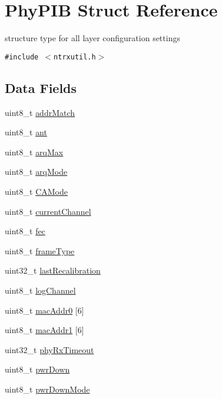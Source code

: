\hypertarget{structPhyPIB}{
\section{Phy\-PIB Struct Reference}
\label{structPhyPIB}
}
structure type for all layer configuration settings  


{\tt \#include $<$ntrxutil.h$>$}

\subsection*{Data Fields}
\begin{CompactItemize}
\item 
uint8\_\-t \hyperlink{structPhyPIB_d9f427fffb85f5e78768cdb51d926ddf}{addr\-Match}
\item 
uint8\_\-t \hyperlink{structPhyPIB_90a4fd3a47774b102b093feac7c72abc}{ant}
\item 
uint8\_\-t \hyperlink{structPhyPIB_3e8ae26144997bb464f1b615ff7b3135}{arq\-Max}
\item 
uint8\_\-t \hyperlink{structPhyPIB_a1043ef18681a9185b3d1f64da749ca3}{arq\-Mode}
\item 
uint8\_\-t \hyperlink{structPhyPIB_d5602e62e32738292b3edbcf40870b81}{CAMode}
\item 
uint8\_\-t \hyperlink{structPhyPIB_4793ae8a873bb85946ee9a68022111c0}{current\-Channel}
\item 
uint8\_\-t \hyperlink{structPhyPIB_10855487a6799bb4d208e1405a7bd466}{fec}
\item 
uint8\_\-t \hyperlink{structPhyPIB_86e33c64b8d8ee7c9a79ccc1e370fd18}{frame\-Type}
\item 
uint32\_\-t \hyperlink{structPhyPIB_690daf620d0f7b7edc24bb67159b3ce6}{last\-Recalibration}
\item 
uint8\_\-t \hyperlink{structPhyPIB_48bcd0749bde19da43893f434f1b9f37}{log\-Channel}
\item 
uint8\_\-t \hyperlink{structPhyPIB_68f03e4314b8c5b78fc11992c232ff5e}{mac\-Addr0} \mbox{[}6\mbox{]}
\item 
uint8\_\-t \hyperlink{structPhyPIB_5cd8ee4b722c3e7aea459b449b770147}{mac\-Addr1} \mbox{[}6\mbox{]}
\item 
uint32\_\-t \hyperlink{structPhyPIB_916b1f69a27f327bdde9b8a04e68c719}{phy\-Rx\-Timeout}
\item 
uint8\_\-t \hyperlink{structPhyPIB_81348ee11b93c57fe6a1d8af03a0246a}{pwr\-Down}
\item 
uint8\_\-t \hyperlink{structPhyPIB_5497aeeb7e5fd935c8f167e094f12b4a}{pwr\-Down\-Mode}

\end{CompactItemize}
